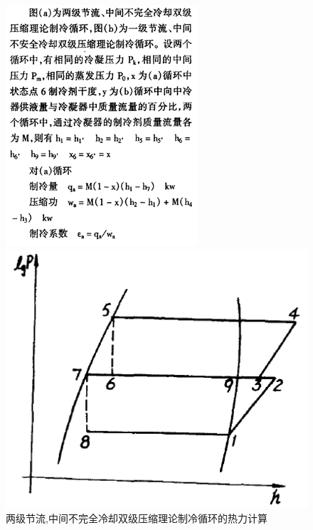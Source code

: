 \documentclass{ctexart}
\begin{document}
\begin{figure}
	\begin{minipage}{0.45\textwidth}
		\includegraphics{no52}
	\end{minipage}
	\begin{minipage}{0.45\textwidth}
		\includegraphics{no53}
	\end{minipage}
\caption{两级节流,中间不完全冷却双级压缩理论制冷循环的热力计算}
\end{figure}
\end{document}
